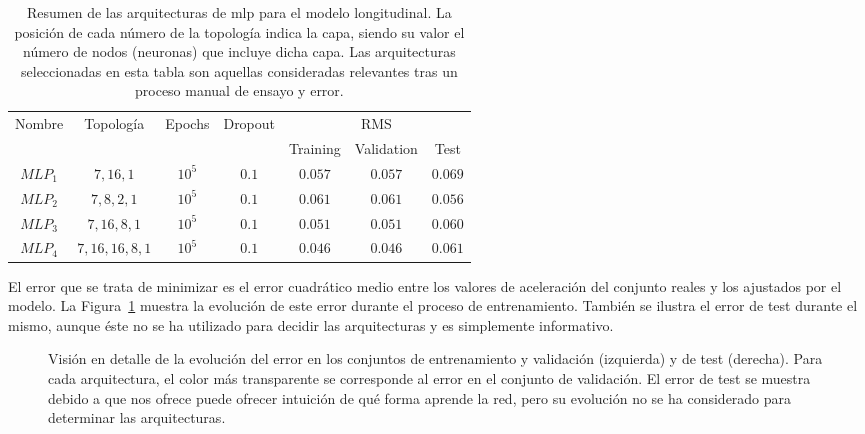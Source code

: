 \begin{table}[t]
	\centering
	\caption[Resumen de las arquitecturas \ac{mlp} para el modelo longitudinal]{Resumen de las arquitecturas de \ac{mlp} para el modelo longitudinal. La posición de cada número de la topología indica la capa, siendo su valor el número de nodos (neuronas) que incluye dicha capa. Las arquitecturas seleccionadas en esta tabla son aquellas consideradas relevantes tras un proceso manual de ensayo y error.}
	\label{tbl:cf-mlp-architectures}
	\begin{tabular}{ccccccc}
		\hline
		\multirow{2}{*}{Nombre} & \multirow{2}{*}{Topología} & \multirow{2}{*}{Epochs} & \multirow{2}{*}{Dropout} & \multicolumn{3}{c}{RMS}      \\
		&                            &                         &                          & Training & Validation & Test \\ \hline
		$MLP_1$ & $7, 16, 1$        & $10^5$ & $0.1$ & $0.057$ & $0.057$ & $0.069$  \\
		$MLP_2$ & $7, 8, 2, 1$      & $10^5$ & $0.1$ & $0.061$ & $0.061$ & $0.056$  \\
		$MLP_3$ & $7, 16, 8, 1$     & $10^5$ & $0.1$ & $0.051$ & $0.051$ & $0.060$  \\
		$MLP_4$ & $7, 16, 16, 8, 1$ & $10^5$ & $0.1$ & $0.046$ & $0.046$ & $0.061$  \\ \hline
	\end{tabular}
\end{table}

El error que se trata de minimizar es el error cuadrático medio entre los valores de aceleración del conjunto reales y los ajustados por el modelo. La Figura~\ref{fig:lm-mlp-rmse-all-comparisons} muestra la evolución de este error durante el proceso de entrenamiento. También se ilustra el error de test durante el mismo, aunque éste no se ha utilizado para decidir las arquitecturas y es simplemente informativo.

\begin{figure}
	\centering
	\qquad
	\caption[Evolución del error durante el entrenamiento en las arquitecturas de \ac{mlp} para el modelo longitudinal]{Visión en detalle de la evolución del error en los conjuntos de entrenamiento y validación (izquierda) y de test (derecha). Para cada arquitectura, el color más transparente se corresponde al error en el conjunto de validación. El error de test se muestra debido a que nos ofrece puede ofrecer intuición de qué forma aprende la red, pero su evolución no se ha considerado para determinar las arquitecturas.}
	\label{fig:lm-mlp-rmse-all-comparisons}
\end{figure}

